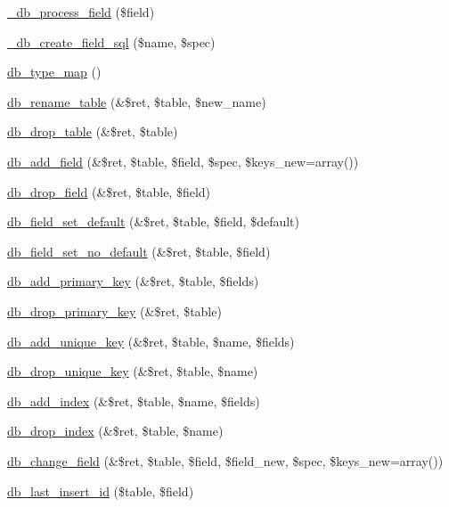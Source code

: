 \begin{Indent}{\bf }
\begin{CompactItemize}
\item 
\hyperlink{group__schemaapi_g4c5486f85f0d1feeb4efba32f01926fb}{\_\-db\_\-process\_\-field} (\$field)
\item 
\hyperlink{group__schemaapi_ge5ec976573ad46239192dcd139d07f10}{\_\-db\_\-create\_\-field\_\-sql} (\$name, \$spec)
\item 
\hyperlink{group__schemaapi_gadf0495656599ba9336d68675b54f8dd}{db\_\-type\_\-map} ()
\item 
\hyperlink{group__schemaapi_gbb4d2d8b00f915ba7e8c0a9d985d597d}{db\_\-rename\_\-table} (\&\$ret, \$table, \$new\_\-name)
\item 
\hyperlink{group__schemaapi_g1da2016702d7da653316aa34fcd86bd9}{db\_\-drop\_\-table} (\&\$ret, \$table)
\item 
\hyperlink{group__schemaapi_gdffaa3314b3f50ffd6ba4da381ec78fb}{db\_\-add\_\-field} (\&\$ret, \$table, \$field, \$spec, \$keys\_\-new=array())
\item 
\hyperlink{group__schemaapi_ge2013b878edbcfe21ca123e73af4684a}{db\_\-drop\_\-field} (\&\$ret, \$table, \$field)
\item 
\hyperlink{group__schemaapi_gf5a1ae05cf11189bc6e0f6a8ed2b7701}{db\_\-field\_\-set\_\-default} (\&\$ret, \$table, \$field, \$default)
\item 
\hyperlink{group__schemaapi_ga01758e1338d2b1ce59da26c08c6448a}{db\_\-field\_\-set\_\-no\_\-default} (\&\$ret, \$table, \$field)
\item 
\hyperlink{group__schemaapi_g95e6db824dbcdd4f9f486e657137d482}{db\_\-add\_\-primary\_\-key} (\&\$ret, \$table, \$fields)
\item 
\hyperlink{group__schemaapi_gb8ee0e7e9ca04e60ec8b0464a247425d}{db\_\-drop\_\-primary\_\-key} (\&\$ret, \$table)
\item 
\hyperlink{group__schemaapi_g407af986b5e78e1ef11242d5be8adfc4}{db\_\-add\_\-unique\_\-key} (\&\$ret, \$table, \$name, \$fields)
\item 
\hyperlink{group__schemaapi_g727ffb0cbdb6bc2afd5803b09e296603}{db\_\-drop\_\-unique\_\-key} (\&\$ret, \$table, \$name)
\item 
\hyperlink{group__schemaapi_gaaa3b734b6b1acc09fb5e2ac8bd7d925}{db\_\-add\_\-index} (\&\$ret, \$table, \$name, \$fields)
\item 
\hyperlink{group__schemaapi_g3a9c0b20502c5afb8177be5753f8cdbb}{db\_\-drop\_\-index} (\&\$ret, \$table, \$name)
\item 
\hyperlink{group__schemaapi_g03f152245358d2db68d067aa8a1fceb4}{db\_\-change\_\-field} (\&\$ret, \$table, \$field, \$field\_\-new, \$spec, \$keys\_\-new=array())
\item 
\hyperlink{group__schemaapi_g1d29b142caeee2f0f2217be16857b9ae}{db\_\-last\_\-insert\_\-id} (\$table, \$field)
\end{CompactItemize}
\end{Indent}


